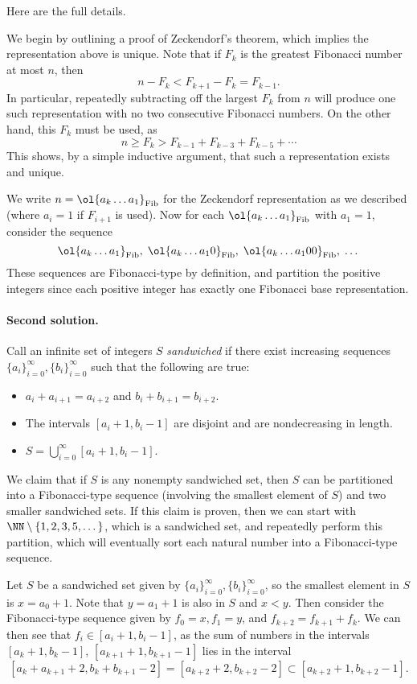 Here are the full details.

We begin by outlining a proof of Zeckendorf's theorem,
which implies the representation above is unique.
Note that if $F_k$ is the greatest Fibonacci number at most $n$,
then \[n - F_k < F_{k+1} - F_{k} = F_{k-1}.\]
In particular, repeatedly subtracting off the largest $F_k$
from $n$ will produce one such representation with
no two consecutive Fibonacci numbers.
On the other hand, this $F_k$ must be used, as
\[ n \ge F_k > F_{k-1} + F_{k-3} + F_{k-5} + \dotsb \]
This shows, by a simple inductive argument,
that such a representation exists and unique.

We write $n = \ol{a_k\dotso a_1}_{\text{Fib}}$
for the Zeckendorf representation as we described
(where $a_i = 1$ if $F_{i+1}$ is used).
Now for each $\ol{a_k\dotso a_1}_{\text{Fib}}$
with $a_1 = 1$, consider the sequence
\[ \ol{a_k\dotso a_1}_{\text{Fib}}, \;
  \ol{a_k\dotso a_1 0}_{\text{Fib}}, \;
  \ol{a_k\dotso a_1 00}_{\text{Fib}}, \; \dots \]
These sequences are Fibonacci-type by definition,
and partition the positive integers since
each positive integer has exactly one Fibonacci base representation.

\paragraph{Second solution.} Call an infinite set of integers $S$ \textit{sandwiched} if there exist increasing sequences $\{a_i\}_{i=0}^{\infty}, \{b_i\}_{i=0}^{\infty}$ such that the following are true:
\begin{itemize}
\item $a_i + a_{i+1} = a_{i+2}$ and $b_i + b_{i+1} = b_{i+2}$.
\item The intervals $[a_i+1,b_i-1]$ are disjoint and are nondecreasing in length.
\item $\displaystyle S = \bigcup_{i=0}^{\infty} [a_i+1,b_i-1]$.
\end{itemize}

We claim that if $S$ is any nonempty sandwiched set, then $S$ can be partitioned into a Fibonacci-type sequence (involving the smallest element of $S$) and two smaller sandwiched sets. If this claim is proven, then we can start with $\NN \setminus \{1,2,3,5,\dots\}$, which is a sandwiched set, and repeatedly perform this partition, which will eventually sort each natural number into a Fibonacci-type sequence.

Let $S$ be a sandwiched set given by $\{a_i\}_{i=0}^{\infty}, \{b_i\}_{i=0}^{\infty}$, so the smallest element in $S$ is $x = a_0 + 1$. Note that $y = a_1+1$ is also in $S$ and $x < y$. Then consider the Fibonacci-type sequence given by $f_0 = x, f_1 = y$, and $f_{k+2} = f_{k+1} + f_k$. We can then see that $f_i \in [a_i+1,b_i-1]$, as the sum of numbers in the intervals $[a_{k}+1,b_{k}-1]$, $[a_{k+1}+1,b_{k+1}-1]$ lies in the interval \[[a_{k} + a_{k+1} + 2,b_k + b_{k+1}-2] = [a_{k+2}+2,b_{k+2}-2] \subset [a_{k+2}+1,b_{k+2}-1].\]

